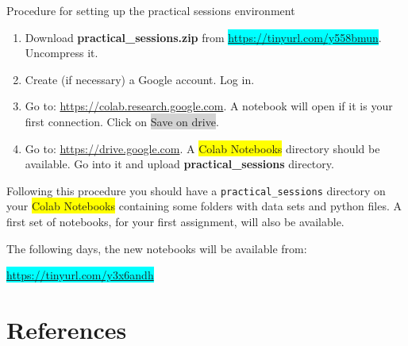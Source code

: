 \documentclass[xcolor=pdftex,dvipsnames,table,mathserif]{beamer}
\begin{document}
\begin{frame}{Procedure for setting up the practical sessions environment}

  \scriptsize

  \begin{enumerate}
  \item Download \textbf{practical\_sessions.zip} from \colorbox{cyan}{\url{https://tinyurl.com/y558bmun}}. Uncompress it.
  \item Create (if necessary) a Google account. Log in.
  \item Go to: \url{https://colab.research.google.com}. A notebook will open if it is your first connection. Click on \colorbox{lightgray}{Save on drive}.
  \item Go to: \url{https://drive.google.com}. A \colorbox{yellow}{Colab Notebooks} directory should be available. Go into it and upload \textbf{practical\_sessions} directory.
  \end{enumerate}

  Following this procedure you should have a \texttt{practical\_sessions} directory on your \colorbox{yellow}{Colab Notebooks} containing some folders with data sets and python files. A first set of notebooks, for your first assignment, will also be available.

  The following days, the new notebooks will be available from:

  \centering

  \colorbox{cyan}{\url{https://tinyurl.com/y3x6andh}}


\end{frame}



\section*{References}



\end{document}
